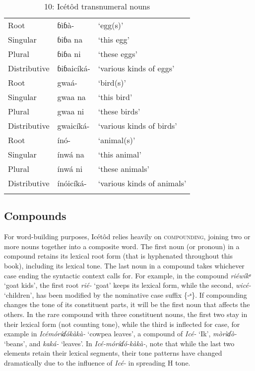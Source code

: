 \begin{table}
\caption{10: Icétôd transnumeral nouns}
\label{tab:4}


\begin{tabularx}{\textwidth}{XXX}
\lsptoprule

Root & ɓìɓà- & ‘egg(s)’\\
Singular & ɓiɓa na & ‘this egg’\\
Plural & ɓiɓa ni & ‘these eggs’\\
Distributive & ɓiɓaicíká- & ‘various kinds of eggs’\\
Root & gwaá- & ‘bird(s)’\\
Singular & gwaa na & ‘this bird’\\
Plural & gwaa ni & ‘these birds’\\
Distributive & gwaicíká- & ‘various kinds of birds’\\
Root & ínó- & ‘animal(s)’\\
Singular & ínwá na & ‘this animal’\\
Plural & ínwá ni & ‘these animals’\\
Distributive & ínóicíká- & ‘various kinds of animals’\\
\lspbottomrule
\end{tabularx}
\end{table}



\subsection{Compounds}


For word-building purposes, Icétôd relies heavily on \textsc{compounding}, joining two or more nouns together into a composite word. The first noun (or pronoun) in a compound retains its lexical root form (that is hyphenated throughout this book), including its lexical tone. The last noun in a compound takes whichever case ending the syntactic context calls for. For example, in the compound \textit{riéwíkᵃ} ‘goat kids’, the first root \textit{rié-} ‘goat’ keeps its lexical form, while the second, \textit{wicé-} ‘children’, has been modified by the nominative case suffix \{-ᵃ\}. If compounding changes the tone of its constituent parts, it will be the first noun that affects the others. In the rare compound with three constituent nouns, the first two stay in their lexical form (not counting tone), while the third is inflected for case, for example in \textit{Icémóríɗókàkà-} ‘cowpea leaves’, a compound of \textit{Icé-} ‘Ik’, \textit{mòrìɗò-} ‘beans’, and \textit{kaká-} ‘leaves’. In \textit{Icé-móríɗó-kàkà-}, note that while the last two elements retain their lexical segments, their tone patterns have changed dramatically due to the influence of \textit{Icé-} in spreading H tone.


